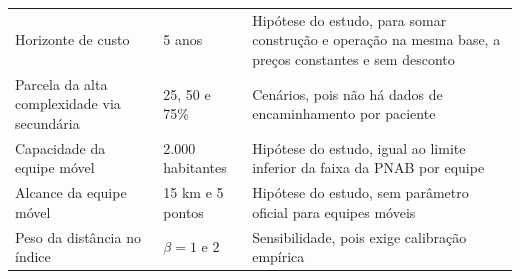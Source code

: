 \begin{table}[htbp]
\begin{tabular}{p{.26\linewidth}p{.19\linewidth}p{.44\linewidth}}
Horizonte de custo & 5 anos & Hipótese do estudo, para somar construção e operação na mesma base, a preços constantes e sem desconto\\
Parcela da alta complexidade via secundária & 25, 50 e 75\% & Cenários, pois não há dados de encaminhamento por paciente\\
Capacidade da equipe móvel & 2.000 habitantes & Hipótese do estudo, igual ao limite inferior da faixa da PNAB por equipe\\
Alcance da equipe móvel & 15 km e 5 pontos & Hipótese do estudo, sem parâmetro oficial para equipes móveis\\
Peso da distância no índice & $\beta=1$ e $2$ & Sensibilidade, pois exige calibração empírica \citep{guagliardo2004}\\
\bottomrule\end{tabular}
\end{table}

